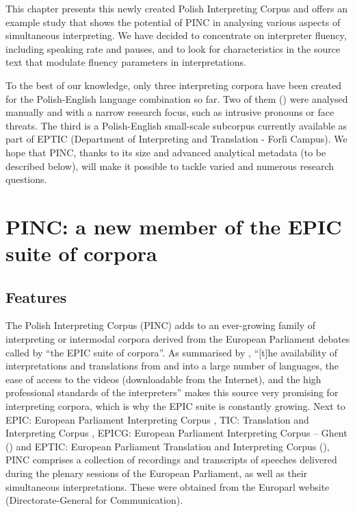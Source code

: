 \documentclass[output=paper]{langscibook}
\begin{document}
This chapter presents this newly created Polish Interpreting Corpus and offers an example study that shows the potential of PINC in analysing various aspects of simultaneous interpreting. We have decided to concentrate on interpreter fluency, including speaking rate and pauses, and to look for characteristics in the source text that modulate fluency parameters in interpretations. 

To the best of our knowledge, only three interpreting corpora have been created for the Polish-English language combination so far. Two of them (\citealt{Dumara2015,Bartlomiejczyk2016}) were analysed manually and with a narrow research focus, such as intrusive pronouns or face threats. The third is a Polish-English small-scale subcorpus currently available as part of EPTIC (Department of Interpreting and Translation - Forlì Campus). We hope that PINC, thanks to its size and advanced analytical metadata (to be described below), will make it possible to tackle varied and numerous research questions.

\section{PINC: a new member of the EPIC suite of corpora}\label{sec:chmiel:2}
\subsection{Features}\label{sec:chmiel:2.1}

The Polish Interpreting Corpus (PINC) adds to an ever-growing family of interpreting or intermodal corpora derived from the European Parliament debates called by \citet{BernardiniEtAl2018} “the EPIC suite of corpora”. As summarised by \citet[22]{BernardiniEtAl2018}, “[t]he availability of interpretations and translations from and into a large number of languages, the ease of access to the videos (downloadable from the Internet), and the high professional standards of the interpreters” makes this source very promising for interpreting corpora, which is why the EPIC suite is constantly growing. Next to EPIC: European Parliament Interpreting Corpus \citep{MontiEtAl2005}, TIC: Translation and Interpreting Corpus \citep[57]{KajzerWietrzny2012}, EPICG: European Parliament Interpreting Corpus – Ghent (\citealt{DefrancqEtAl2015}) and EPTIC: European Parliament Translation and Interpreting Corpus (\citealt{FerraresiBernardini2019}), PINC comprises a collection of recordings and transcripts of speeches delivered during the plenary sessions of the European Parliament, as well as their simultaneous interpretations. These were obtained from the Europarl website (Directorate-General for Communication).
\end{document}
